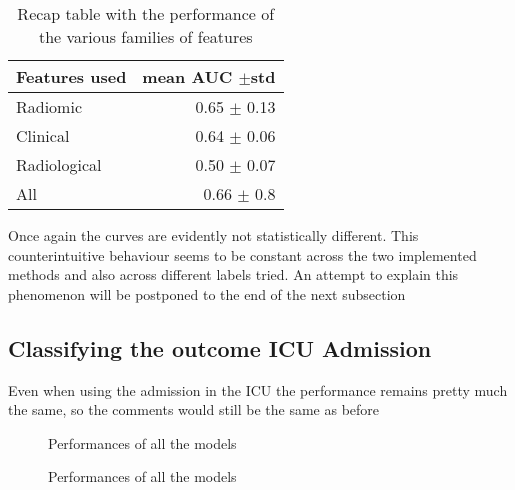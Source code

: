\begin{table}
\caption{Recap table with the performance of the various families of features \label{tab:RecapDeathRF}}
\centering
\begin{tabular}{l|r}
\toprule
Features used & mean AUC $\pm$std\\
\midrule
Radiomic  & 0.65 $\pm$ 0.13\\
Clinical  &  0.64 $\pm$ 0.06\\
Radiological & 0.50 $\pm$ 0.07\\
All & 0.66 $\pm$ 0.8 \\
\bottomrule
\end{tabular}
\end{table}

Once again the curves are evidently not statistically different. This counterintuitive behaviour seems to be constant across the two implemented methods and also across different labels tried. An attempt to explain this phenomenon will be postponed to the end of the next subsection

\subsection{Classifying the outcome ICU Admission}
Even when using the admission in the ICU the performance remains pretty much the same, so the comments would still be the same as before

\begin{figure}[H]
\centering
	\newline
        \caption{Performances of all the models}\label{fig:RFicu}
\end{figure}


\begin{figure}[H]
\centering
	\newline
        \caption{Performances of all the models}\label{fig:RFicuROC}
\end{figure}


